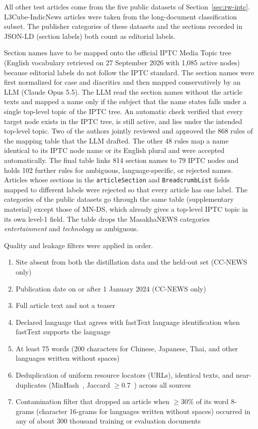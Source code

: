 \documentclass{ieeeaccess}
\begin{document}
All other test articles come from the five public datasets of Section~\ref{sec:rw-iptc}. L3Cube-IndicNews articles were taken from the long-document classification subset. The publisher categories of these datasets and the sections recorded in JSON-LD (section labels) both count as editorial labels.

Section names have to be mapped onto the official IPTC Media Topic tree (English vocabulary retrieved on 27 September 2026 with 1,085 active nodes) because editorial labels do not follow the IPTC standard. The section names were first normalized for case and diacritics and then mapped conservatively by an LLM (Claude Opus 5.5). The LLM read the section names without the article texts and mapped a name only if the subject that the name states falls under a single top-level topic of the IPTC tree. An automatic check verified that every target node exists in the IPTC tree, is still active, and lies under the intended top-level topic. Two of the authors jointly reviewed and approved the 868 rules of the mapping table that the LLM drafted. The other 48 rules map a name identical to its IPTC node name or its English plural and were accepted automatically. The final table links 814 section names to 79 IPTC nodes and holds 102 further rules for ambiguous, language-specific, or rejected names. Articles whose sections in the \texttt{articleSection} and \texttt{BreadcrumbList} fields mapped to different labels were rejected so that every article has one label. The categories of the public datasets go through the same table (supplementary material) except those of MN-DS, which already gives a top-level IPTC topic in its own level-1 field. The table drops the MasakhaNEWS categories \emph{entertainment} and \emph{technology} as ambiguous.

Quality and leakage filters were applied in order.
\begin{enumerate}
  \item Site absent from both the distillation data and the held-out set (CC-NEWS only)
  \item Publication date on or after 1 January 2024 (CC-NEWS only)
  \item Full article text and not a teaser
  \item Declared language that agrees with fastText language identification when fastText supports the language
  \item At least 75 words (200 characters for Chinese, Japanese, Thai, and other languages written without spaces)
  \item Deduplication of uniform resource locators (URLs), identical texts, and near-duplicates (MinHash~\cite{broder1997resemblance}, Jaccard $\ge 0.7$~\cite{lee2022dedup}) across all sources
  \item Contamination filter that dropped an article when $\ge 30\%$ of its word 8-grams (character 16-grams for languages written without spaces) occurred in any of about 300 thousand training or evaluation documents
\end{enumerate}
\end{document}
